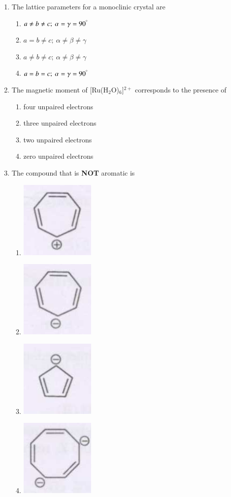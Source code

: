 \documentclass[12pt]{article}
\begin{document}
\begin{enumerate}
\item  The lattice parameters for a monoclinic crystal are
\begin{enumerate}
    \item  $a \neq b \neq c; \ \alpha = \gamma = 90^\degree$
    \item  $a = b \neq c; \ \alpha \neq \beta \neq \gamma$
    \item $a \neq b \neq c; \ \alpha \neq \beta \neq \gamma$\
    \item  $a = b = c; \ \alpha = \gamma = 90^\degree$    \hfill{}
\end{enumerate}
    



    \item The magnetic moment of [Ru(H$_2$O)$_6$]$^{2+}$
 corresponds to the presence of
    \begin{enumerate}
    \item  four unpaired electrons 
    \item  three unpaired electrons
    \item  two unpaired electrons 
    \item  zero unpaired electrons    \hfill{}
    \end{enumerate}

    

    \item  The compound that is \textbf{NOT} aromatic is
\begin{enumerate}
    \item \includegraphics[width=0.1\columnwidth]{figs/q7 a.png} 
    \item \includegraphics[width=0.1\columnwidth]{figs/q7 b.png} 
    \item \includegraphics[width=0.1\columnwidth]{figs/q7 c.png} 
    \item \includegraphics[width=0.1\columnwidth]{figs/q7 d.png} 
\end{enumerate}



\end{enumerate}
\end{document}
